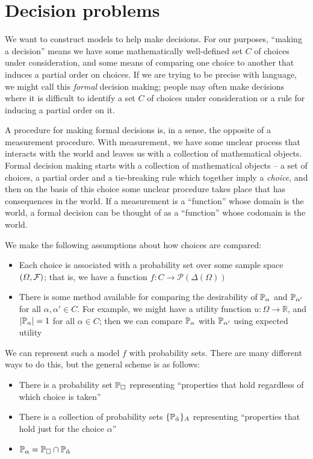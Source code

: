 

\section{Decision problems}

We want to construct models to help make decisions. For our purposes, ``making a decision'' means we have some mathematically well-defined set $C$ of choices under consideration, and some means of comparing one choice to another that induces a partial order on choices. If we are trying to be precise with language, we might call this \emph{formal} decision making; people may often make decisions where it is difficult to identify a set $C$ of choices under consideration or a rule for inducing a partial order on it.

A procedure for making formal decisions is, in a sense, the opposite of a measurement procedure. With measurement, we have some unclear process that interacts with the world and leaves us with a collection of mathematical objects. Formal decision making starts with a collection of mathematical objects -- a set of choices, a partial order and a tie-breaking rule which together imply a \emph{choice}, and then on the basis of this choice some unclear procedure takes place that has consequences in the world. If a measurement is a ``function'' whose domain is the world, a formal decision can be thought of as a ``function'' whose codomain is the world.

We make the following assumptions about how choices are compared:
\begin{itemize}
    \item Each choice is associated with a probability set over some sample space $(\Omega,\mathcal{F})$; that is, we have a function $f:C\to \mathscr{P}(\Delta(\Omega))$
    \item There is some method available for comparing the desirability of $\mathbb{P}_{\alpha}$ and $\mathbb{P}_{\alpha'}$ for all $\alpha,\alpha'\in C$. For example, we might have a utility function $u:\Omega\to \mathbb{R}$, and $|\mathbb{P}_{\alpha}|=1$ for all $\alpha\in C$; then we can compare $\mathbb{P}_{\alpha}$ with $\mathbb{P}_{\alpha'}$ using expected utility
\end{itemize}

We can represent such a model $f$ with probability sets. There are many different ways to do this, but the general scheme is as follows:

\begin{itemize}
    \item There is a probability set $\mathbb{P}_\square$ representing ``properties that hold regardless of which choice is taken''
    \item There is a collection of probability sets $\{\mathbb{P}_{\tilde{\alpha}}\}_A$ representing ``properties that hold just for the choice $\alpha$''
    \item $\mathbb{P}_\alpha=\mathbb{P}_\square \cap \mathbb{P}_{\tilde{\alpha}}$
\end{itemize}

